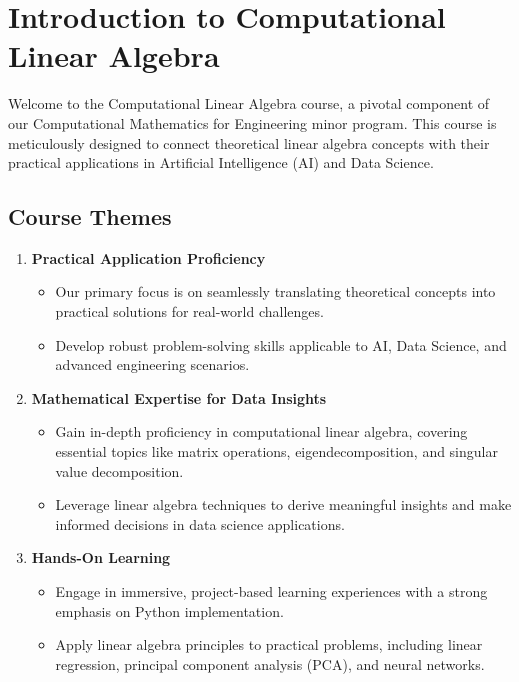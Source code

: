 \documentclass[
  letterpaper,
  DIV=11,
  numbers=noendperiod]{scrreprt}
\providecommand{\tightlist}{%
  \setlength{\itemsep}{0pt}\setlength{\parskip}{0pt}}\usepackage{longtable,booktabs,array}
\theoremstyle{plain}
\theoremstyle{definition}
\theoremstyle{remark}
\begin{document}

\section*{Introduction to Computational Linear
Algebra}\label{introduction-to-computational-linear-algebra}


Welcome to the Computational Linear Algebra course, a pivotal component
of our Computational Mathematics for Engineering minor program. This
course is meticulously designed to connect theoretical linear algebra
concepts with their practical applications in Artificial Intelligence
(AI) and Data Science.

\subsection*{Course Themes}\label{course-themes}

\begin{enumerate}
\def\labelenumi{\arabic{enumi}.}
\tightlist
\item
  \textbf{Practical Application Proficiency}

  \begin{itemize}
  \tightlist
  \item
    Our primary focus is on seamlessly translating theoretical concepts
    into practical solutions for real-world challenges.
  \item
    Develop robust problem-solving skills applicable to AI, Data
    Science, and advanced engineering scenarios.
  \end{itemize}
\item
  \textbf{Mathematical Expertise for Data Insights}

  \begin{itemize}
  \tightlist
  \item
    Gain in-depth proficiency in computational linear algebra, covering
    essential topics like matrix operations, eigendecomposition, and
    singular value decomposition.
  \item
    Leverage linear algebra techniques to derive meaningful insights and
    make informed decisions in data science applications.
  \end{itemize}
\item
  \textbf{Hands-On Learning}

  \begin{itemize}
  \tightlist
  \item
    Engage in immersive, project-based learning experiences with a
    strong emphasis on Python implementation.
  \item
    Apply linear algebra principles to practical problems, including
    linear regression, principal component analysis (PCA), and neural
    networks.
  \end{itemize}
\end{enumerate}
\end{document}
